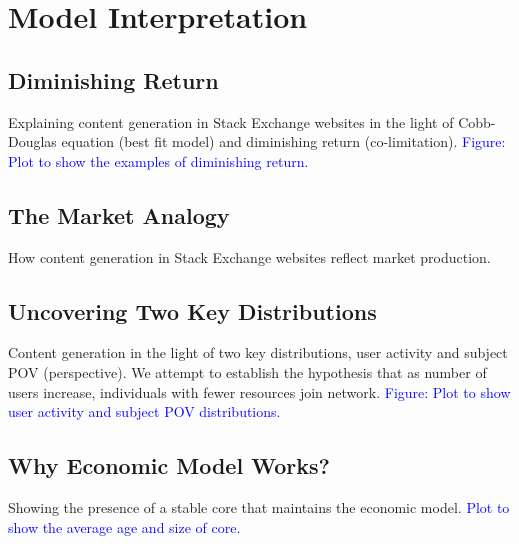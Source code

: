 \section{Model Interpretation}
\subsection{Diminishing Return} 
Explaining content generation in Stack Exchange websites in the light of Cobb-Douglas equation (best fit model) and diminishing return (co-limitation). \textcolor{blue}{Figure: Plot to show the examples of diminishing return.}

\subsection{The Market Analogy} 
How content generation in Stack Exchange websites reflect market production.

\subsection{Uncovering Two Key Distributions} 
Content generation in the light of two key distributions, user activity and subject POV (perspective). We attempt to establish the hypothesis that as number of users increase, individuals with fewer resources join network. \textcolor{blue}{Figure: Plot to show user activity and subject POV distributions.}

\subsection{Why Economic Model Works?} 
Showing the presence of a stable core that maintains the economic model. \textcolor{blue}{Plot to show the average age and size of core.}